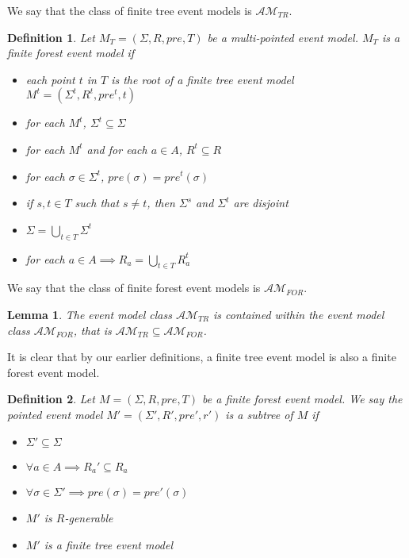 \documentclass[12pt, a4paper, titlepage]{scrartcl}
\newtheorem{defn}{Definition}[subsection]
\newtheorem{lemma}{Lemma}[subsection]
\numberwithin{equation}{section}
\newcommand{\eventClass}{\mathcal{AM}}
\newcommand{\treeClass}{\eventClass_{TR}}
\newcommand{\forestClass}{\eventClass_{FOR}}
\begin{document}
We say that the class of finite tree event models is $\treeClass$.

\begin{defn} \label{forest}
Let $M_T = (\Sigma, R, pre, T)$ be a multi-pointed event model.
$M_T$ is a finite forest event model if
\begin{itemize}
	\item each point $t$ in $T$ is the root of a finite tree event model $M^t = (\Sigma^t, R^t,
	pre^t, t)$
	\item for each $M^t$, $\Sigma^t \subseteq \Sigma$
	\item for each $M^t$ and for each $a \in A$, $R^t \subseteq R$
	\item for each $\sigma \in \Sigma^t$, $pre(\sigma) = pre^t(\sigma)$
	\item if $s, t \in T$ such that $s \neq t$, then $\Sigma^s$ and $\Sigma^t$ are disjoint
  \item $\Sigma = \bigcup_{t \in T} \Sigma^t$
  \item for each $a \in A \implies R_a = \bigcup_{t \in T} R_a^t$
\end{itemize}
\end{defn}

We say that the class of finite forest event models is $\forestClass$.

\begin{lemma} \label{treeIsForest}
The event model class $\treeClass$ is contained within the event model class
$\forestClass$, that is $\treeClass \subseteq \forestClass$.
\end{lemma}

It is clear that by our earlier definitions, a finite tree event model is also a finite forest event
model.

\begin{defn} \label{subtree}
Let $M = (\Sigma, R, pre, T)$ be a finite forest event model.
We say the pointed event model $M' = (\Sigma', R', pre', r')$ is a subtree of $M$ if
\begin{itemize}
	\item $\Sigma' \subseteq \Sigma$
	\item $\forall a \in A \implies R_a' \subseteq R_a$
	\item $\forall \sigma \in \Sigma' \implies pre(\sigma) = pre'(\sigma) $
	\item $M'$ is $R$-generable
	\item $M'$ is a finite tree event model
\end{itemize}
\end{defn}
\end{document}
